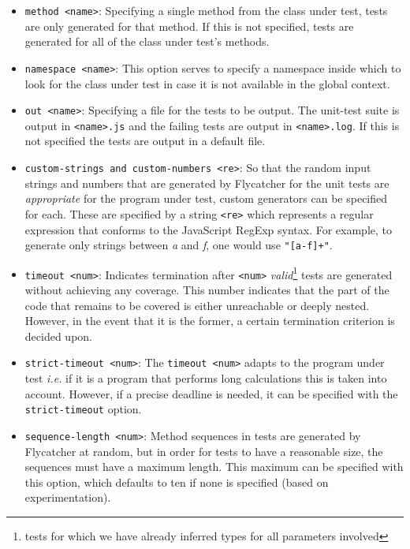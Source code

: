 \begin{itemize}
   \item \texttt{\textendash \textendash method <name>}: Specifying a single method from the class under test, tests are only generated for that method. If this is not specified, tests are generated for all of the class under test's methods.
   \item \texttt{\textendash \textendash namespace <name>}: This option serves to specify a namespace inside which to look for the class under test in case it is not available in the global context.
   \item \texttt{\textendash \textendash out <name>}: Specifying a file for the tests to be output. The unit-test suite is output in \texttt{<name>.js} and the failing tests are output in \texttt{<name>.log}. If this is not specified the tests are output in a default file.
   \item \texttt{\textendash \textendash custom-strings and \textendash \textendash custom-numbers <re>}: So that the random input strings and numbers that are generated by \textsf{Flycatcher} for the unit tests are \emph{appropriate} for the program under test, custom generators can be specified for each. These are specified by a string \texttt{<re>} which represents a regular expression that conforms to the JavaScript RegExp syntax. For example, to generate only strings between \emph{a} and \emph{f}, one would use \texttt{"[a-f]+"}.
   \item \texttt{\textendash \textendash timeout <num>}: Indicates termination after \texttt{<num>} \emph{valid}\footnote{tests for which we have already inferred types for all parameters involved} tests are generated without achieving any coverage. This number indicates that the part of the code that remains to be covered is either unreachable or deeply nested. However, in the event that it is the former, a certain termination criterion is decided upon.
   \item \texttt{\textendash \textendash strict-timeout <num>}: The \texttt{\textendash \textendash timeout <num>} adapts to the program under test \emph{i.e.} if it is a program that performs long calculations this is taken into account. However, if a precise deadline is needed, it can be specified with the \texttt{strict-timeout} option.
   \item \texttt{\textendash \textendash sequence-length <num>}: Method sequences in tests are generated by \textsf{Flycatcher} at random, but in order for tests to have a reasonable size, the sequences must have a maximum length. This maximum can be specified with this option, which defaults to ten if none is specified (based on experimentation).

\end{itemize}
